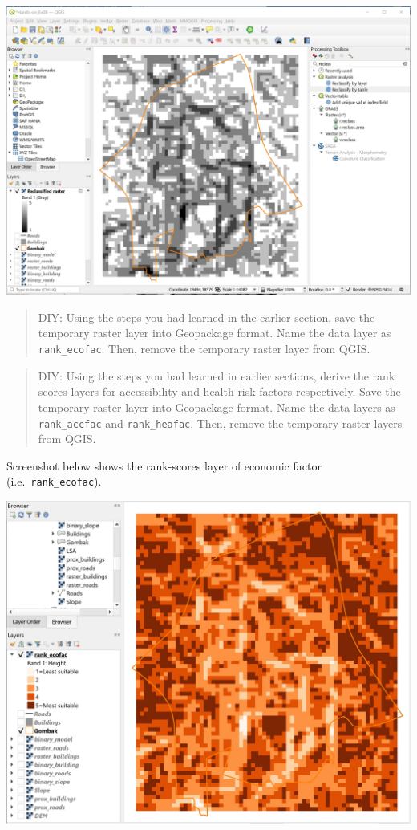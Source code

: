 \documentclass[
  letterpaper,
  DIV=11,
  numbers=noendperiod]{scrreprt}
\begin{document}
\includegraphics{./img08/image5.jpg}

\begin{quote}
DIY: Using the steps you had learned in the earlier section, save the
temporary raster layer into Geopackage format. Name the data layer as
\texttt{rank\_ecofac}. Then, remove the temporary raster layer from
QGIS.
\end{quote}

\begin{quote}
DIY: Using the steps you had learned in earlier sections, derive the
rank scores layers for accessibility and health risk factors
respectively. Save the temporary raster layer into Geopackage format.
Name the data layers as \texttt{rank\_accfac} and \texttt{rank\_heafac}.
Then, remove the temporary raster layers from QGIS.
\end{quote}

Screenshot below shows the rank-scores layer of economic factor
(i.e.~\texttt{rank\_ecofac}).

\includegraphics{./img08/image6.jpg}
\end{document}
